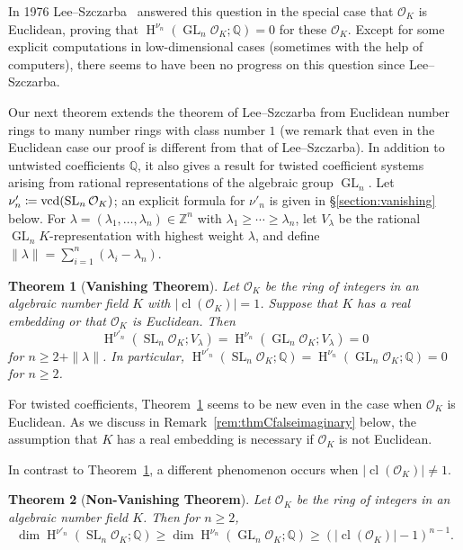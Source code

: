 \documentclass[11 pt]{article}
\theoremstyle{plain}
\newtheorem{maintheorem}{Theorem}
\theoremstyle{definition}
\numberwithin{equation}{section}
\DeclareMathOperator{\GL}{GL}
\DeclareMathOperator{\SL}{SL}
\newcommand\Z{\ensuremath{\mathbb{Z}}}
\newcommand\Q{\ensuremath{\mathbb{Q}}}
\DeclareMathOperator{\HH}{H}
\newcommand{\para}[1]{\bigskip\noindent\textbf{#1.}}
\renewcommand{\O}{\mathcal{O}}
\DeclareMathOperator{\vcd}{vcd}
\DeclareMathOperator{\class}{cl}
\newcommand\coloneq{\mathrel{\mathop:}\mkern-1.2mu=}
\newcommand\abs[1]{\left\lvert#1\right\rvert}
\newcommand\GLvcd{\nu_n}
\newcommand\SLvcd{\nu'_n}
\begin{document}
In 1976 Lee--Szczarba~\cite[Theorem~1.3]{LeeSzczarbaCongruence} answered this question in the special case that $\O_K$ is Euclidean, proving that $\HH^{\GLvcd}(\GL_n \O_K;\Q)=0$ for these $\O_K$.      Except for some explicit computations in low-dimensional cases (sometimes with the help of computers), there seems to have been no progress on this question since Lee--Szczarba.   



Our next theorem extends the theorem of Lee--Szczarba from Euclidean number rings to many number rings with class number $1$ (we remark that even in the Euclidean case our proof is different from
that of Lee--Szczarba).  In addition to untwisted coefficients $\Q$, it also gives a result for twisted coefficient systems arising from rational representations
of the algebraic group $\GL_n$.  Let $\SLvcd\coloneq  \vcd(\SL_n \O_K)$; an explicit formula for $\SLvcd$ is given in \S\ref{section:vanishing} below.  
For $\lambda = (\lambda_1,\ldots,\lambda_n) \in \Z^n$ with
$\lambda_1 \geq \cdots \geq \lambda_n$, 
let $V_{\lambda}$ be the rational $\GL_n K$-representation
with highest weight $\lambda$, and define $\|\lambda\| = \sum_{i=1}^{n} (\lambda_i - \lambda_n)$.

\begin{maintheorem}[\textbf{Vanishing Theorem}]
\label{maintheorem:vanishing}
Let $\O_K$ be the ring of integers in an algebraic number field $K$ with $\abs{\class(\O_K)} = 1$.  Suppose that 
$K$ has a real embedding or that $\O_K$ is Euclidean. Then 
\[\HH^{\SLvcd}(\SL_n \O_K;V_{\lambda}) = \HH^{\GLvcd}(\GL_n \O_K;V_{\lambda}) = 0\]
for $n \geq 2 + \|\lambda\|$.  In particular, $\HH^{\SLvcd}(\SL_n \O_K;\Q) = \HH^{\GLvcd}(\GL_n \O_K;\Q) = 0$ for $n\geq 2$.
\end{maintheorem}
For twisted coefficients, Theorem~\ref{maintheorem:vanishing} seems to be new even in the case when $\O_K$ is Euclidean.
As we discuss in Remark~\ref{rem:thmCfalseimaginary} below, the assumption that $K$ has a real embedding is necessary if $\O_K$ is not Euclidean.

In contrast to Theorem~\ref{maintheorem:vanishing}, 
a different phenomenon occurs when $\abs{\class(\O_K)} \neq 1$.

\begin{maintheorem}[\textbf{Non-Vanishing Theorem}]
\label{maintheorem:nonvanishing} 
Let $\O_K$ be the ring of integers in an algebraic number field $K$.  Then for $n \geq 2$,
\[\dim \HH^{\SLvcd}(\SL_n \O_K;\Q) \geq \dim \HH^{\GLvcd}(\GL_n \O_K;\Q) \geq (\abs{\class(\O_K)} - 1)^{n-1}.\]
\end{maintheorem}
\end{document}
